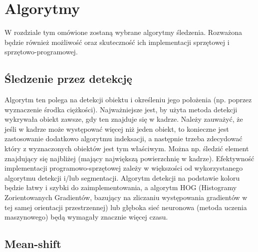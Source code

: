 \chapter{Algorytmy}
\label{cha:algorytmy}

W rozdziale tym omówione zostaną wybrane algorytmy śledzenia. Rozważona będzie również możliwość oraz skuteczność ich implementacji sprzętowej i sprzętowo-programowej.

\section{Śledzenie przez detekcję}
\label{sec:sledzenieprzezdetekcje}

Algorytm ten polega na detekcji obiektu i określeniu jego położenia (np. poprzez wyznaczenie środka ciężkości). Najważniejsze jest, by użyta metoda detekcji wykrywała obiekt zawsze, gdy ten znajduje się w kadrze.
Należy zauważyć, że jeśli w kadrze może występować więcej niż jeden obiekt, to konieczne jest zastosowanie dodatkowo algorytmu indeksacji, a następnie trzeba zdecydować który z wyznaczonych obiektów jest tym właściwym.
Można np. śledzić element znajdujący się najbliżej (mający największą powierzchnię w kadrze).
Efektywność implementacji programowo-sprzętowej zależy w większości od wykorzystanego algorytmu detekcji i/lub segmentacji.
Algorytm detekcji na podstawie koloru będzie łatwy i szybki do zaimplementowania, a algorytm HOG (Histogramy Zorientowanych Gradientów, bazujący na zliczaniu występowania gradientów w tej samej orientacji przestrzennej) lub głęboka sieć neuronowa (metoda uczenia maszynowego) będą wymagały znacznie więcej czasu.


\section{Mean-shift}
\label{sec:meanshift}

